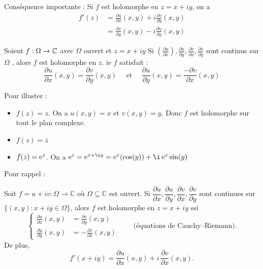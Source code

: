 Conséquence importante : Si $f$ est holomorphe en $z= x+iy$, on a 
\begin{align*}
    f'(z) &= \frac{\partial u}{\partial x}(x,y)+ i \frac{\partial v}{\partial y}(x,y)\\
    &= \frac{\partial v}{\partial y}(x,y) - i\frac{ \partial u }{\partial y}(x,y) 
\end{align*}
\begin{corollaire}
    Soient $ f: \Omega \to \mathbb{C} $ avec $ \Omega $ ouvert  et $z= x+iy$
    Si $(\frac{\partial u}{\partial x}), \frac{\partial u}{\partial y}, \frac{\partial v}{\partial x}, \frac{\partial v }{\partial y}$ sont continus sur $\Omega$ , alors $f$ est holomorphe en $z$. ie $f$ satisfait :  $$\frac{\partial u}{\partial x}(x,y)= \frac{\partial v}{\partial y}(x,y) \quad \text{ et }\quad \frac{\partial u}{\partial y}(x,y)= \frac{-\partial v}{\partial x}(x,y)$$
\end{corollaire}
\begin{exemple}
Pour illuster :
    \begin{itemize}
        \item $f(z) = z$. On a $u(x,y) = x$ et $v(x,y) = y$. Donc $f$ est holomorphe sur tout le plan complexe.
        \item $f(z) = \overline{z}$
        \item $f(z) = \operatorname{e}^z$. On a $\e^z = \e^{x+\i y} = \e^x(\cos(y)) + \i \e^x\sin(y)$
    \end{itemize}
\end{exemple}

\begin{remarque}
Pour rappel :

Soit $f = u + iv : \Omega \to \mathbb{C}$ où $\Omega \subseteq \mathbb{C}$ est ouvert.
Si $\dfrac{\partial u}{\partial x}, \dfrac{\partial u}{\partial y}, \dfrac{\partial v}{\partial x}, \dfrac{\partial v}{\partial y}$
sont continues sur $\{(x,y) : x + iy \in \Omega\}$, alors $f$ est holomorphe en $z = x + iy$ ssi
\[
\left\{
\begin{aligned}
\frac{\partial u}{\partial x}(x,y) &= \frac{\partial v}{\partial y}(x,y) \\[4pt]
\frac{\partial u}{\partial y}(x,y) &= -\frac{\partial v}{\partial x}(x,y)
\end{aligned}
\right.
\qquad \text{(équations de Cauchy--Riemann).}
\]
De plus,
\[
f'(x+iy) = \frac{\partial u}{\partial x}(x,y) + i\,\frac{\partial v}{\partial x}(x,y).
\]
\end{remarque}

